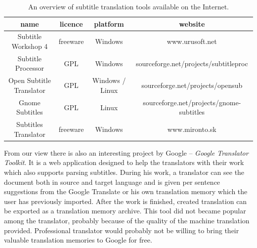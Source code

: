 \begin{table}[h]

\begin{center}
\begin{tabular}{|c|c|c|c|}
\hline
\bf name & \bf licence & \bf platform & \bf website \\
\hline
Subtitle Workshop 4 & freeware & Windows & www.urusoft.net \\
\hline
Subtitle Processor & GPL & Windows & sourceforge.net/projects/subtitleproc \\
\hline
Open Subtitle Translator & GPL & Windows / Linux & sourceforge.net/projects/opensub \\
\hline
Gnome Subtitles & GPL & Linux & sourceforge.net/projects/gnome-subtitles \\
\hline
Subtitles Translator & freeware & Windows & www.mironto.sk \\ \hline

\end{tabular}
\end{center}

\caption{An overview of subtitle translation tools available on the Internet.} \label{subtitles_tools}
\end{table}

From our view there is also an interesting project by Google -- \emph{Google Translator Toolkit}. It is a web application designed to help the translators with their work which also supports parsing subtitles. During his work, a translator can see the document both in source and target language and is given per sentence suggestions from the Google Translate or his own translation memory which the user has previously imported. After the work is finished, created translation can be exported as a translation memory archive. This tool did not became popular among the translator, probably because of the quality of the machine translation provided. Professional translator would probably not be willing to bring their valuable translation memories to Google for free. 

